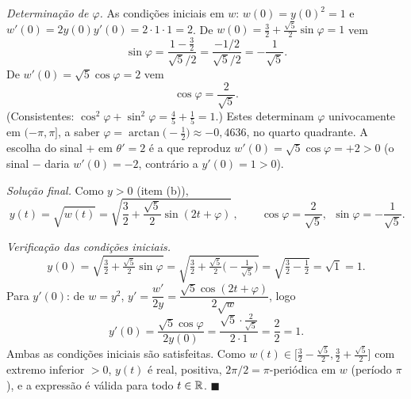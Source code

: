 \begin{enumerate}[label=(\alph*)]
\emph{Determinação de $\varphi$.} As condições iniciais em $w$: $w(0)=y(0)^2=1$ e $w'(0)=2y(0)y'(0)=2\cdot1\cdot1=2$. De $w(0)=\tfrac32+\tfrac{\sqrt5}{2}\sin\varphi=1$ vem
\[
\sin\varphi=\frac{1-\tfrac32}{\sqrt5/2}=\frac{-1/2}{\sqrt5/2}=-\frac1{\sqrt5}.
\]
De $w'(0)=\sqrt5\cos\varphi=2$ vem
\[
\cos\varphi=\frac{2}{\sqrt5}.
\]
(Consistentes: $\cos^2\varphi+\sin^2\varphi=\tfrac45+\tfrac15=1$.) Estes determinam $\varphi$ univocamente em $(-\pi,\pi]$, a saber $\varphi=\arctan\!\big(\!-\tfrac12\big)\approx-0{,}4636$, no quarto quadrante. A escolha do sinal $+$ em $\theta'=2$ é a que reproduz $w'(0)=\sqrt5\cos\varphi=+2>0$ (o sinal $-$ daria $w'(0)=-2$, contrário a $y'(0)=1>0$).

\emph{Solução final.} Como $y>0$ (item (b)),
\[
\boxed{\,y(t)=\sqrt{w(t)}=\sqrt{\frac32+\frac{\sqrt5}{2}\sin(2t+\varphi)}\,},\qquad
\cos\varphi=\frac2{\sqrt5},\ \ \sin\varphi=-\frac1{\sqrt5}.
\]

\emph{Verificação das condições iniciais.}
\[
y(0)=\sqrt{\tfrac32+\tfrac{\sqrt5}{2}\sin\varphi}=\sqrt{\tfrac32+\tfrac{\sqrt5}{2}\big(\!-\tfrac1{\sqrt5}\big)}=\sqrt{\tfrac32-\tfrac12}=\sqrt1=1 .
\]
Para $y'(0)$: de $w=y^2$, $y'=\dfrac{w'}{2y}=\dfrac{\sqrt5\cos(2t+\varphi)}{2\sqrt{w}}$, logo
\[
y'(0)=\frac{\sqrt5\cos\varphi}{2y(0)}=\frac{\sqrt5\cdot\tfrac2{\sqrt5}}{2\cdot1}=\frac{2}{2}=1 .
\]
Ambas as condições iniciais são satisfeitas. Como $w(t)\in\big[\tfrac32-\tfrac{\sqrt5}2,\tfrac32+\tfrac{\sqrt5}2\big]$ com extremo inferior $>0$, $y(t)$ é real, positiva, $2\pi/2=\pi$-periódica em $w$ (período $\pi$), e a expressão é válida para todo $t\in\mathbb{R}$. \qquad$\blacksquare$

\end{enumerate}
